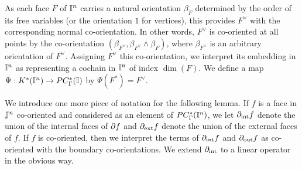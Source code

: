As each face $F$ of $\mathbb{I}^n$ carries a natural orientation $\beta_F$ determined by the order of its free variables (or the orientation $1$ for vertices), this provides $F^\vee$ with the corresponding normal co-orientation. In other words, $F^\vee$ is co-oriented at all points by the co-orientation $(\beta_{F^\vee},\beta_{F^\vee}\wedge \beta_F)$, where $\beta_{F^\vee}$ is an arbitrary orientation of $F^\vee$. Assigning $F^\vee$ this co-orientation, we interpret its embedding in $\mathbb{I}^n$ as representing a cochain in $\mathbb{I}^n$ of index $\dim(F)$. 
We define a map $\Psi: K^*(\mathbb{I}^n)\to PC_\Gamma^*(\mathbb{I})$ by $\Psi(F^*)=F^\vee$. 

We introduce one more piece of notation for the following lemma. If $f$ is a face in $\mathbb{J}^n$ co-oriented and considered as an element of $PC^*_\Gamma(\mathbb{I}^n)$, we let $\partial_{\text{int}}f$ denote the union of the internal faces of $\partial f$ and $\partial_{\text{ext}}f$ denote the union of the external faces of $f$. If $f$ is co-oriented, then we interpret the terms of $\partial_{\text{int}}f$ and $\partial_{\text{out}}f$ as co-oriented with the boundary co-orientations. We extend $\partial_{\text{int}}$ to a linear operator in the obvious way.





